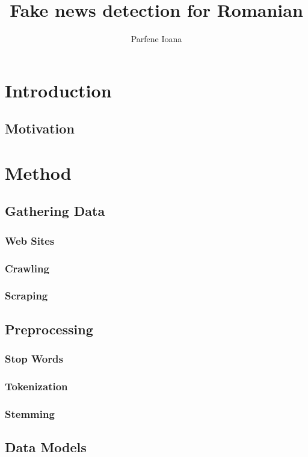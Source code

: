 \documentclass{article}
\author{Parfene Ioana}
\title{\textbf{Fake news detection for Romanian}}
\begin{document}
	\maketitle
	
	\section{Introduction}
	\par
	\subsection{Motivation}	

	
	\section{Method}
	
	\subsection{Gathering Data}
	\subsubsection{Web Sites}
	\subsubsection{Crawling}
	\subsubsection{Scraping}

	\subsection{Preprocessing}
	\subsubsection{Stop Words}
	\subsubsection{Tokenization}
	\subsubsection{Stemming}
	
	\subsection{Data Models}
\end{document}
